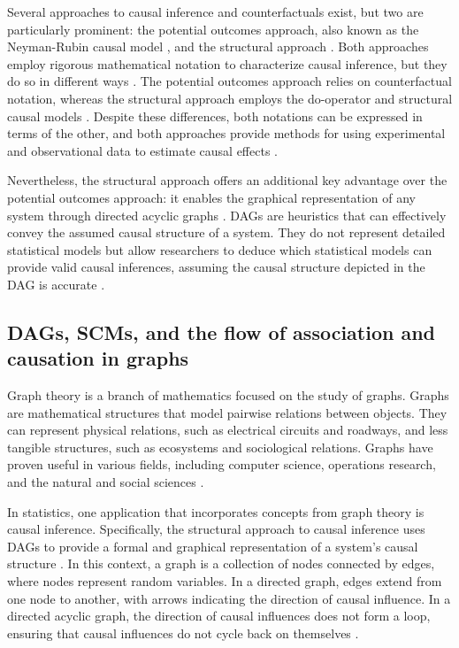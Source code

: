 \documentclass[
  authoryear,
  preprint,
  1p]{elsarticle}
\begin{document}
Several approaches to causal inference and counterfactuals exist, but
two are particularly prominent: the potential outcomes approach, also
known as the Neyman-Rubin causal model
\citep{Neyman_et_al_1923, Rubin_1974}, and the structural approach
\citep{Wright_1921, Pearl_2009, Pearl_et_al_2016}. Both approaches
employ rigorous mathematical notation to characterize causal inference,
but they do so in different ways \citep{Neal_2020}. The potential
outcomes approach relies on counterfactual notation, whereas the
structural approach employs the do-operator and structural causal models
\citep[SCM,][]{Pearl_2009, Pearl_et_al_2016}. Despite these differences,
both notations can be expressed in terms of the other, and both
approaches provide methods for using experimental and observational data
to estimate causal effects \citep{Pearl_2010}.

Nevertheless, the structural approach offers an additional key advantage
over the potential outcomes approach: it enables the graphical
representation of any system through directed acyclic graphs
\citep[DAG,][]{Gross_et_al_2018, Neal_2020}. DAGs are heuristics that
can effectively convey the assumed causal structure of a system. They do
not represent detailed statistical models but allow researchers to
deduce which statistical models can provide valid causal inferences,
assuming the causal structure depicted in the DAG is accurate
\citep{McElreath_2020}.

\subsection{DAGs, SCMs, and the flow of association and causation in
graphs}\label{sec-background-dag}

Graph theory is a branch of mathematics focused on the study of graphs.
Graphs are mathematical structures that model pairwise relations between
objects. They can represent physical relations, such as electrical
circuits and roadways, and less tangible structures, such as ecosystems
and sociological relations. Graphs have proven useful in various fields,
including computer science, operations research, and the natural and
social sciences \citep{Gross_et_al_2018}.

In statistics, one application that incorporates concepts from graph
theory is causal inference. Specifically, the structural approach to
causal inference uses DAGs to provide a formal and graphical
representation of a system's causal structure \citep{Neal_2020}. In this
context, a graph is a collection of nodes connected by edges, where
nodes represent random variables. In a directed graph, edges extend from
one node to another, with arrows indicating the direction of causal
influence. In a directed acyclic graph, the direction of causal
influences does not form a loop, ensuring that causal influences do not
cycle back on themselves \citep{McElreath_2020}.
\end{document}
